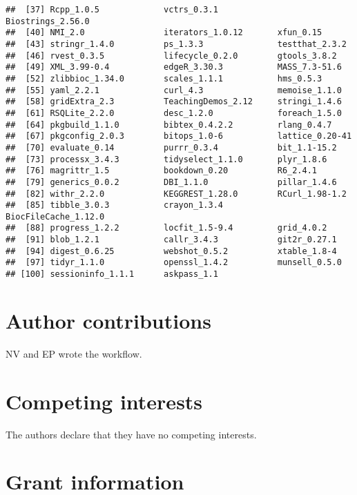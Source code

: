 \documentclass[9pt,a4paper,]{extarticle}
\begin{document}
\begin{verbatim}
##  [37] Rcpp_1.0.5             vctrs_0.3.1            Biostrings_2.56.0     
##  [40] NMI_2.0                iterators_1.0.12       xfun_0.15             
##  [43] stringr_1.4.0          ps_1.3.3               testthat_2.3.2        
##  [46] rvest_0.3.5            lifecycle_0.2.0        gtools_3.8.2          
##  [49] XML_3.99-0.4           edgeR_3.30.3           MASS_7.3-51.6         
##  [52] zlibbioc_1.34.0        scales_1.1.1           hms_0.5.3             
##  [55] yaml_2.2.1             curl_4.3               memoise_1.1.0         
##  [58] gridExtra_2.3          TeachingDemos_2.12     stringi_1.4.6         
##  [61] RSQLite_2.2.0          desc_1.2.0             foreach_1.5.0         
##  [64] pkgbuild_1.1.0         bibtex_0.4.2.2         rlang_0.4.7           
##  [67] pkgconfig_2.0.3        bitops_1.0-6           lattice_0.20-41       
##  [70] evaluate_0.14          purrr_0.3.4            bit_1.1-15.2          
##  [73] processx_3.4.3         tidyselect_1.1.0       plyr_1.8.6            
##  [76] magrittr_1.5           bookdown_0.20          R6_2.4.1              
##  [79] generics_0.0.2         DBI_1.1.0              pillar_1.4.6          
##  [82] withr_2.2.0            KEGGREST_1.28.0        RCurl_1.98-1.2        
##  [85] tibble_3.0.3           crayon_1.3.4           BiocFileCache_1.12.0  
##  [88] progress_1.2.2         locfit_1.5-9.4         grid_4.0.2            
##  [91] blob_1.2.1             callr_3.4.3            git2r_0.27.1          
##  [94] digest_0.6.25          webshot_0.5.2          xtable_1.8-4          
##  [97] tidyr_1.1.0            openssl_1.4.2          munsell_0.5.0         
## [100] sessioninfo_1.1.1      askpass_1.1
\end{verbatim}

\hypertarget{author-contributions}{%
\section{Author contributions}\label{author-contributions}}

NV and EP wrote the workflow.

\hypertarget{competing-interests}{%
\section{Competing interests}\label{competing-interests}}

The authors declare that they have no competing interests.

\hypertarget{grant-information}{%
\section{Grant information}\label{grant-information}}
\end{document}
